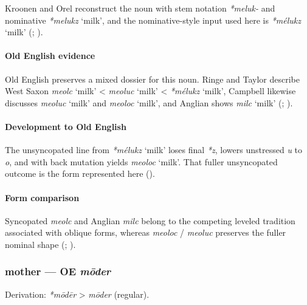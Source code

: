 \documentclass[
  british,
  a4paper,
]{article}
\providecommand{\Recon}[1]{\emph{*#1}}
\begin{document}
Kroonen and Orel reconstruct the noun with stem notation \emph{*meluk-}
and nominative \Recon{melukz} `milk', and the nominative-style input
used here is \Recon{mélukz} `milk' (; ).

\paragraph{Old English evidence}\label{old-english-evidence-49}

Old English preserves a mixed dossier for this noun. Ringe and Taylor
describe West Saxon \emph{meolc} `milk' \textless{} \emph{meoluc} `milk'
\textless{} \Recon{mélukz} `milk', Campbell likewise discusses
\emph{meoluc} `milk' and {\emph{meoloc}} `milk', and Anglian shows
\emph{milc} `milk' (; ).

\paragraph{Development to Old
English}\label{development-to-old-english-48}

The unsyncopated line from \Recon{mélukz} `milk' loses final \emph{*z},
lowers unstressed \emph{u} to \emph{o}, and with back mutation yields
{\emph{meoloc}} `milk'. That fuller unsyncopated outcome is the form
represented here ().

\paragraph{Form comparison}\label{form-comparison-1}

Syncopated \emph{meolc} and Anglian \emph{milc} belong to the competing
leveled tradition associated with oblique forms, whereas \emph{meoloc} /
\emph{meoluc} preserves the fuller nominal shape
(;
).

\subsubsection{\texorpdfstring{mother --- OE
\emph{mōder}}{mother --- OE mōder}}\label{mother-oe-mux14dder}

Derivation: \emph{*mōdēr} \textgreater{} \emph{mōder} (regular).
\end{document}
